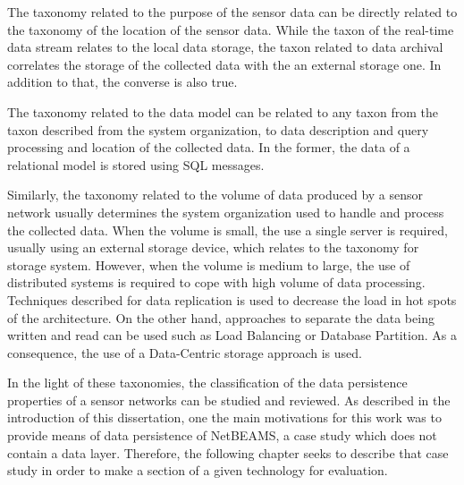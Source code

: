 The taxonomy related to the purpose of the sensor data can be directly related
to the taxonomy of the location of the sensor data. While the taxon of the 
real-time data stream relates to the local data storage, the taxon related to
data archival correlates the storage of the collected data with the an external
storage one. In addition to that, the converse is also true.

The taxonomy related to the data model can be related to any taxon from the
taxon described from the system organization, to data description and query
processing and location of the collected data. In the former, the data of a
relational model is stored using SQL messages.

Similarly, the taxonomy related to the volume of data produced by a sensor
network usually determines the system organization used to handle and process
the collected data. When the volume is small, the use a single server is
required, usually using an external storage device, which relates to the
taxonomy for storage system. However, when the volume is medium to large, the
use of distributed systems is required to cope with high volume of data
processing. Techniques described for data replication is used to decrease the
load in hot spots of the architecture. On the other hand, approaches to
separate the data being written and read can be used such as Load Balancing or
Database Partition. As a consequence, the use of a Data-Centric storage
approach is used.

In the light of these taxonomies, the classification of the data persistence
properties of a sensor networks can be studied and reviewed. As described in
the introduction of this dissertation, one the main motivations for this work
was to provide means of data persistence of NetBEAMS, a case study which does
not contain a data layer. Therefore, the following chapter seeks to describe
that case study in order to make a section of a given technology for evaluation.

